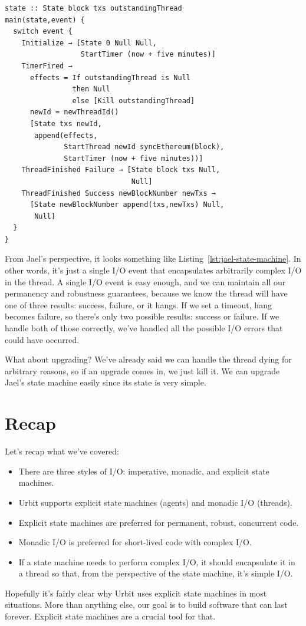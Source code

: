\documentclass[twoside]{article}
\begin{document}
\begin{lstlisting}[style=listingblock,
                   float=p!,
                   caption={Jael's state machine},
                   label={lst:jael-state-machine}]
state :: State block txs outstandingThread
main(state,event) {
  switch event {
    Initialize → [State 0 Null Null,
                  StartTimer (now + five minutes)]
    TimerFired →
      effects = If outstandingThread is Null
                then Null
                else [Kill outstandingThread]
      newId = newThreadId()
      [State txs newId,
       append(effects,
              StartThread newId syncEthereum(block),
              StartTimer (now + five minutes))]
    ThreadFinished Failure → [State block txs Null,
                              Null]
    ThreadFinished Success newBlockNumber newTxs →
      [State newBlockNumber append(txs,newTxs) Null,
       Null]
  }
}
\end{lstlisting}

From Jael's perspective, it looks something like Listing~\ref{lst:jael-state-machine}.  In other words, it's just a single I/O event
that encapsulates arbitrarily complex I/O in the thread. A single I/O
event is easy enough, and we can maintain all our permanency and
robustness guarantees, because we know the thread will have one of three
results: success, failure, or it hangs. If we set a timeout, hang
becomes failure, so there's only two possible results: success or
failure. If we handle both of those correctly, we've handled all the
possible I/O errors that could have occurred.

What about upgrading? We've already said we can handle the thread dying
for arbitrary reasons, so if an upgrade comes in, we just kill it. We
can upgrade Jael's state machine easily since its state is very simple.

\newpage
\section{Recap}\label{recap}

Let's recap what we've covered:

\begin{itemize}[noitemsep,topsep=2pt]
  \item  There are three styles of I/O: imperative, monadic, and explicit state machines.
  \item  Urbit supports explicit state machines (agents) and monadic I/O
  (threads).
  \item  Explicit state machines are preferred for permanent, robust,
  concurrent code.
  \item  Monadic I/O is preferred for short-lived code with complex I/O.
  \item  If a state machine needs to perform complex I/O, it should encapsulate
  it in a thread so that, from the perspective of the state machine,
  it's simple I/O.
\end{itemize}

Hopefully it's fairly clear why Urbit uses explicit state machines in
most situations. More than anything else, our goal is to build software
that can last forever. Explicit state machines are a crucial tool for
that.\tombstone

\end{document}
